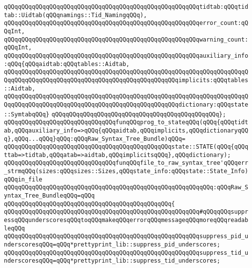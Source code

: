 \verb|qQQqqQQqqQQqqQQqqQQqqQQqqQQqqQQqqQQqqQQqqQQqqQQqqQQqqQQqtidtab:qQQqtidtab::Uidtab(qQQqnamings::Tid_NamingqQQq),|\newline
\verb|qQQqqQQqqQQqqQQqqQQqqQQqqQQqqQQqqQQqqQQqqQQqqQQqqQQqqQQqerror_count:qQQqInt,|\newline
\verb|qQQqqQQqqQQqqQQqqQQqqQQqqQQqqQQqqQQqqQQqqQQqqQQqqQQqqQQqwarning_count:qQQqInt,|\newline
\verb|qQQqqQQqqQQqqQQqqQQqqQQqqQQqqQQqqQQqqQQqqQQqqQQqqQQqqQQqauxiliary_info:qQQq{qQQqaidtab:qQQqtables::Aidtab,|\newline
\verb|qQQqqQQqqQQqqQQqqQQqqQQqqQQqqQQqqQQqqQQqqQQqqQQqqQQqqQQqqQQqqQQqqQQqqQQqqQQqqQQqqQQqqQQqqQQqqQQqqQQqqQQqqQQqqQQqqQQqqQQqimplicits:qQQqtables::Aidtab,|\newline
\verb|qQQqqQQqqQQqqQQqqQQqqQQqqQQqqQQqqQQqqQQqqQQqqQQqqQQqqQQqqQQqqQQqqQQqqQQqqQQqqQQqqQQqqQQqqQQqqQQqqQQqqQQqqQQqqQQqqQQqqQQqdictionary:qQQqstate::SymtabqQQq}|\newline
\verb|qQQqqQQqqQQqqQQqqQQqqQQqqQQqqQQqqQQqqQQqqQQqqQQq};|\newline
\newline
\verb|qQQqqQQqqQQqqQQqqQQqqQQqqQQqqQQqfunqQQqprog_to_stateqQQq(qQQq{qQQqtidtab,qQQqauxiliary_info=>qQQq{qQQqaidtab,qQQqimplicits,qQQqdictionaryqQQq},qQQq...qQQq}qQQq:qQQqRaw_Syntax_Tree_Bundle)qQQq=|\newline
\verb|qQQqqQQqqQQqqQQqqQQqqQQqqQQqqQQqqQQqqQQqqQQqqQQqstate::STATE(qQQq{qQQqttab=>tidtab,qQQqatab=>aidtab,qQQqimplicitsqQQq},qQQqdictionary);|\newline
\newline
\verb|qQQqqQQqqQQqqQQqqQQqqQQqqQQqqQQqfunqQQqfile_to_raw_syntax_tree'qQQqerr_strmqQQq(sizes:qQQqsizes::Sizes,qQQqstate_info:qQQqstate::State_Info)qQQqin_file|\newline
\verb|qQQqqQQqqQQqqQQqqQQqqQQqqQQqqQQqqQQqqQQqqQQqqQQqqQQqqQQqqQQq:qQQqRaw_Syntax_Tree_BundleqQQq=qQQq|\newline
\verb|qQQqqQQqqQQqqQQqqQQqqQQqqQQqqQQqqQQqqQQqqQQqqQQq{|\newline
\verb|qQQqqQQqqQQqqQQqqQQqqQQqqQQqqQQqqQQqqQQqqQQqqQQqqQQqqQQq#qQQqqQQqsuppressqQQqunderscoresqQQqtoqQQqmakeqQQqerrorqQQqmessageqQQqmoreqQQqreadableqQQq|\newline
\verb|qQQqqQQqqQQqqQQqqQQqqQQqqQQqqQQqqQQqqQQqqQQqqQQqqQQqqQQqsuppress_pid_underscoresqQQq=qQQq*prettyprint_lib::suppress_pid_underscores;|\newline
\verb|qQQqqQQqqQQqqQQqqQQqqQQqqQQqqQQqqQQqqQQqqQQqqQQqqQQqqQQqsuppress_tid_underscoresqQQq=qQQq*prettyprint_lib::suppress_tid_underscores;|\newline
